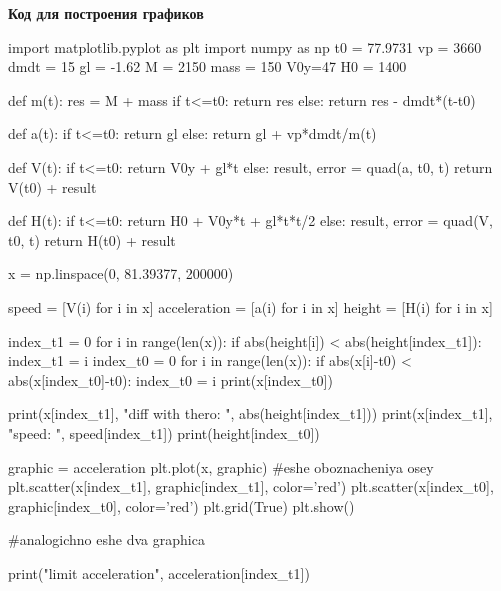 \documentclass[12pt]{article}
\begin{document}
    \large \textbf{Код для построения графиков} \normalsize

\begin{python}
import matplotlib.pyplot as plt
import numpy as np
t0 = 77.9731
vp = 3660
dmdt = 15
gl = -1.62
M = 2150
mass = 150
V0y=47
H0 = 1400

def m(t):
    res = M + mass
    if t<=t0:
        return res
    else:
        return res - dmdt*(t-t0)

def a(t):
    if t<=t0:
        return gl
    else:
        return gl + vp*dmdt/m(t)

def V(t):
    if t<=t0:
        return V0y + gl*t
    else:
        result, error = quad(a, t0, t)
        return V(t0) + result
        
def H(t):
    if t<=t0:
        return H0 + V0y*t + gl*t*t/2
    else:
        result, error = quad(V, t0, t)
        return H(t0) + result


x = np.linspace(0, 81.39377, 200000)

speed = [V(i) for i in x]
acceleration = [a(i) for i in x]
height = [H(i) for i in x]

index_t1 = 0
for i in range(len(x)):
    if abs(height[i]) < abs(height[index_t1]):
        index_t1 = i
index_t0 = 0
for i in range(len(x)):
    if abs(x[i]-t0) < abs(x[index_t0]-t0):
        index_t0 = i
print(x[index_t0])

print(x[index_t1], "diff with thero: ", abs(height[index_t1]))
print(x[index_t1], "speed: ", speed[index_t1])
print(height[index_t0])

graphic = acceleration
plt.plot(x, graphic)
#eshe oboznacheniya osey
plt.scatter(x[index_t1], graphic[index_t1], color='red')
plt.scatter(x[index_t0], graphic[index_t0], color='red')
plt.grid(True)
plt.show()

#analogichno eshe dva graphica


print("limit acceleration", acceleration[index_t1])
\end{python}
\end{document}
